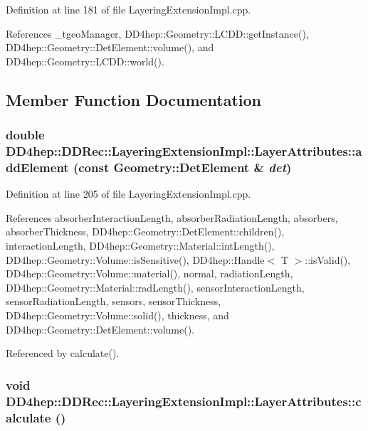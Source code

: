 Definition at line 181 of file LayeringExtensionImpl.cpp.

References \_\-tgeoManager, DD4hep::Geometry::LCDD::getInstance(), DD4hep::Geometry::DetElement::volume(), and DD4hep::Geometry::LCDD::world().

\subsection{Member Function Documentation}
\hypertarget{struct_d_d4hep_1_1_d_d_rec_1_1_layering_extension_impl_1_1_layer_attributes_a39fc239560d87538d35e8e5051b9b0aa}{
\subsubsection[{addElement}]{\setlength{\rightskip}{0pt plus 5cm}double DD4hep::DDRec::LayeringExtensionImpl::LayerAttributes::addElement (const {\bf Geometry::DetElement} \& {\em det})}}
\label{struct_d_d4hep_1_1_d_d_rec_1_1_layering_extension_impl_1_1_layer_attributes_a39fc239560d87538d35e8e5051b9b0aa}


Definition at line 205 of file LayeringExtensionImpl.cpp.

References absorberInteractionLength, absorberRadiationLength, absorbers, absorberThickness, DD4hep::Geometry::DetElement::children(), interactionLength, DD4hep::Geometry::Material::intLength(), DD4hep::Geometry::Volume::isSensitive(), DD4hep::Handle$<$ T $>$::isValid(), DD4hep::Geometry::Volume::material(), normal, radiationLength, DD4hep::Geometry::Material::radLength(), sensorInteractionLength, sensorRadiationLength, sensors, sensorThickness, DD4hep::Geometry::Volume::solid(), thickness, and DD4hep::Geometry::DetElement::volume().

Referenced by calculate().\hypertarget{struct_d_d4hep_1_1_d_d_rec_1_1_layering_extension_impl_1_1_layer_attributes_acb31b89b26048767becea08cccc4d93f}{
\subsubsection[{calculate}]{\setlength{\rightskip}{0pt plus 5cm}void DD4hep::DDRec::LayeringExtensionImpl::LayerAttributes::calculate ()}}
\label{struct_d_d4hep_1_1_d_d_rec_1_1_layering_extension_impl_1_1_layer_attributes_acb31b89b26048767becea08cccc4d93f}


